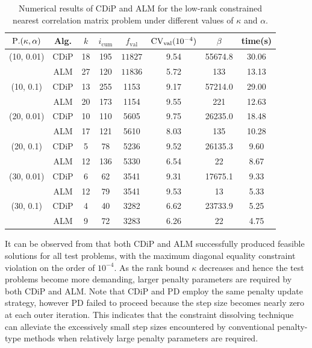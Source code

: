\documentclass[11pt,a4paper,reqno]{amsart}
\begin{document}
{\begin{table}[htbp]
\centering
\begin{tabular}{cccccccc}
\hline
$\rm P.(\kappa, \alpha)$ & Alg. & $k$ & $i_{\text{cum}}$ & $f_{\text{val}}$ & $\rm CV_{\text{val}}(10^{-4})$ & $\beta$ & time(s) \\
\hline
(10, 0.01) & CDiP& 18 & 195 & $11827$ & 9.54& 55674.8& 30.06 \\
& ALM & 27 & 120 & $11836 $ & 5.72& 133 & 13.13 \\[4pt]
(10, 0.1) & CDiP & 13 & 255 & 1153 & 9.17 & 57214.0& 29.00\\
& ALM & 20 & 173& 1154 & 9.55 & 221 & 12.63 \\ [4pt]
(20, 0.01) & CDiP & 10 & 110 & 5605 & 9.75 & 26235.0 & 18.48\\
& ALM & 17 & 121 & 5610& 8.03 & 135& 10.28 \\ [4pt]
(20, 0.1) & CDiP & 5 & 78& 5236& 9.52 & 26135.3 & 9.60\\
& ALM & 12 & 136& 5330 & 6.54 & 22 & 8.67 \\ [4pt]
(30, 0.01) & CDiP & 6 & 62 & 3541 & 9.31 & 17675.1 & 9.33\\
& ALM & 12 & 79 & 3541 & 9.53 & 13 & 5.33 \\ [4pt]
(30, 0.1) & CDiP & 4 & 40 & 3282 & 6.62 & 23733.9 & 5.25 \\
& ALM & 9 & 72 & 3283 & 6.26 & 22 & 4.75 \\
\hline
\end{tabular}
\caption{Numerical results of CDiP and ALM for the low-rank constrained nearest correlation matrix problem under different values of $\kappa$ and $\alpha$.}
\label{tab:LowRank-constrainedCorr}
\end{table}

It can be observed from  that both CDiP and ALM successfully produced feasible solutions for all test problems, with the maximum diagonal equality constraint violation on the order of $10^{-4}$. As the rank bound $\kappa$ decreases and hence the test problems become more demanding, larger penalty parameters are required by both CDiP and ALM. Note that CDiP and PD employ the same penalty update strategy, however PD failed to proceed because the step size becomes nearly zero at each outer iteration. This indicates that the constraint dissolving technique can alleviate the excessively small step sizes encountered by conventional penalty-type methods when relatively large penalty parameters are required.


}
\end{document}

